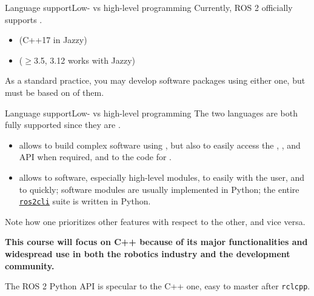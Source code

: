 \begin{frame}{Language support}{Low- vs high-level programming}
  \justifying
  Currently, ROS 2 officially supports .
  \begin{itemize}
    \item {} (C++17 in Jazzy)
    \item {} ($\geq$3.5, 3.12 works with Jazzy)
  \end{itemize}
  \bigskip
  As a standard practice, you may develop software packages using either one, but  must be based on  of them.
\end{frame}
\begin{frame}{Language support}{Low- vs high-level programming}
  \justifying
  The two languages are both fully supported since they are .
  \begin{itemize}
    \item {} allows to build complex software using , but also to easily access the , , and  API when required, and to  the code for .
    \item {} allows to  software, especially high-level modules, to easily  with the user, and to  quickly;  software modules are usually implemented in Python; the entire \href{https://github.com/ros2/ros2cli/tree/jazzy}{\color{blue}\underline{\texttt{ros2cli}}} suite is written in Python.
  \end{itemize}
  Note how one prioritizes other features with respect to the other, and vice versa.
  \begin{block}{}
    \centering
    \textbf{This course will focus on C++ because of its major functionalities and widespread use in both the robotics industry and the development community.}
  \end{block}
  The ROS 2 Python API is specular to the C++ one, easy to master after \texttt{rclcpp}.
\end{frame}
